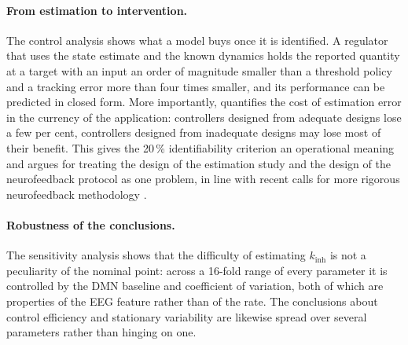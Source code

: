 \documentclass[12pt,a4paper]{article}
\theoremstyle{plain}
\theoremstyle{definition}
\theoremstyle{remark}
\newcommand{\kinh}{k_{\mathrm{inh}}}
\begin{document}
\paragraph{From estimation to intervention.} The control analysis shows what a model buys once it is identified. A regulator that uses the state estimate and the known dynamics holds the reported quantity at a target with an input an order of magnitude smaller than a threshold policy and a tracking error more than four times smaller, and its performance can be predicted in closed form. More importantly,  quantifies the cost of estimation error in the currency of the application: controllers designed from adequate designs lose a few per cent, controllers designed from inadequate designs may lose most of their benefit. This gives the 20\,\% identifiability criterion an operational meaning and argues for treating the design of the estimation study and the design of the neurofeedback protocol as one problem, in line with recent calls for more rigorous neurofeedback methodology \citep{Ros2020,Sitaram2017}.

\paragraph{Robustness of the conclusions.} The sensitivity analysis shows that the difficulty of estimating $\kinh$ is not a peculiarity of the nominal point: across a 16-fold range of every parameter it is controlled by the DMN baseline and coefficient of variation, both of which are properties of the EEG feature rather than of the rate. The conclusions about control efficiency and stationary variability are likewise spread over several parameters rather than hinging on one.
\end{document}

